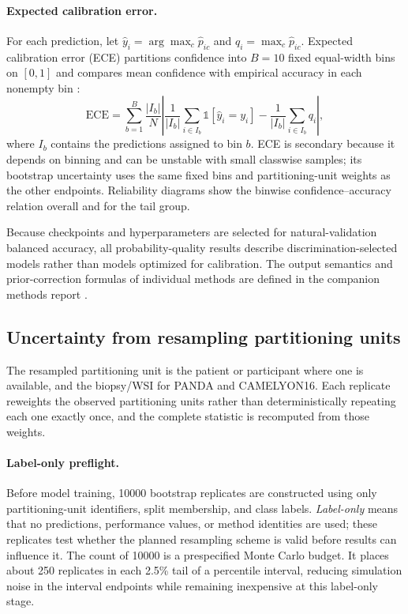\documentclass[11pt]{article}
\begin{document}
\paragraph{Expected calibration error.}
For each prediction, let $\hat{y}_i=\arg\max_c\hat{p}_{ic}$ and $q_i=\max_c\hat{p}_{ic}$. Expected calibration error (ECE) partitions confidence into $B=10$ fixed equal-width bins on $[0,1]$ and compares mean confidence with empirical accuracy in each nonempty bin \citep{naeini2015obtaining}:
\begin{equation}
  \mathrm{ECE}=\sum_{b=1}^{B}\frac{|I_b|}{N}
  \left|\frac{1}{|I_b|}\sum_{i\in I_b}\mathbb{1}[\hat{y}_i=y_i]
  -\frac{1}{|I_b|}\sum_{i\in I_b}q_i\right|,
  \label{eq:ece}
\end{equation}
\noindent where $I_b$ contains the predictions assigned to bin $b$. ECE is secondary because it depends on binning and can be unstable with small classwise samples; its bootstrap uncertainty uses the same fixed bins and partitioning-unit weights as the other endpoints. Reliability diagrams show the binwise confidence--accuracy relation overall and for the tail group.

Because checkpoints and hyperparameters are selected for natural-validation balanced accuracy, all probability-quality results describe discrimination-selected models rather than models optimized for calibration. The output semantics and prior-correction formulas of individual methods are defined in the companion methods report \citep{queisler2026imbalanceMethods}.

\subsection{Uncertainty from resampling partitioning units}
The resampled partitioning unit is the patient or participant where one is available, and the biopsy/WSI for PANDA and CAMELYON16. Each replicate reweights the observed partitioning units rather than deterministically repeating each one exactly once, and the complete statistic is recomputed from those weights.

\paragraph{Label-only preflight.}
Before model training, \num{10000} bootstrap replicates are constructed using only partitioning-unit identifiers, split membership, and class labels. \emph{Label-only} means that no predictions, performance values, or method identities are used; these replicates test whether the planned resampling scheme is valid before results can influence it. The count of \num{10000} is a prespecified Monte Carlo budget. It places about 250 replicates in each 2.5\% tail of a percentile interval, reducing simulation noise in the interval endpoints while remaining inexpensive at this label-only stage.
\end{document}
